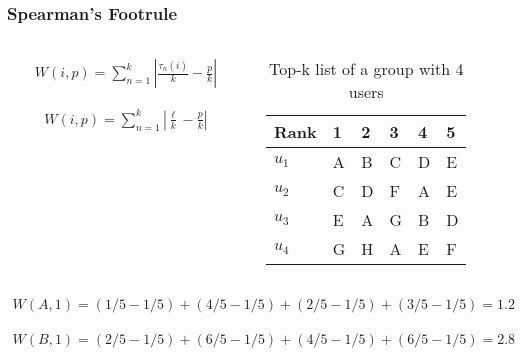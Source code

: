 \begin{frame}[t]
\frametitle{Spearman's Footrule}
\begin{columns}
\begin{column}{0.5\textwidth}
\begin{align*}
W(i,p) = \displaystyle\sum_{n=1}^{k} |\frac{\tau_n(i)}{k} - \frac{p}{k}|
\end{align*}

\begin{align*}
W(i,p) = \displaystyle\sum_{n=1}^{k} |\frac{\ell}{k} - \frac{p}{k}|
\end{align*}
\end{column}
\begin{column}{0.5\textwidth}
\small
\begin{table}
\captionsetup{font=footnotesize}
\begin{tabular}{|l|lllll|} \hline
Rank  & 1 & 2 & 3 & 4 & 5 \\\hline
$u_1$ & A & B & C & D & E \\
$u_2$ & C & D & F & A & E \\
$u_3$ & E & A & G & B & D \\
$u_4$ & G & H & A & E & F\\\hline
\end{tabular}
\caption{Top-k list of a group with 4 users}
\end{table}
\normalsize
\vspace{1cm}
\end{column}
\end{columns}
\begin{align*}
W(A,1) = (1/5 - 1/5) + (4/5 - 1/5) + (2/5 - 1/5) + (3/5 - 1/5) = 1.2
\end{align*}

\begin{align*}
W(B,1) = (2/5 - 1/5) + (6/5 - 1/5) + (4/5 - 1/5) + (6/5 - 1/5) = 2.8
\end{align*}
\end{frame}

